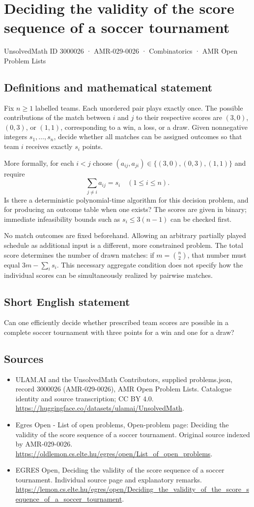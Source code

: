 \documentclass[11pt,a4paper]{article}
\begin{document}
\section*{Deciding the validity of the score sequence of a soccer tournament}\label{3000026}
{\small UnsolvedMath ID 3000026 · AMR-029-0026 · Combinatorics · AMR Open Problem Lists}
\subsection{Definitions and mathematical statement}
Fix $n\ge1$ labelled teams. Each unordered pair plays exactly once.
The possible contributions of the match between $i$ and $j$ to their
respective scores are $(3,0)$, $(0,3)$, or $(1,1)$, corresponding to
a win, a loss, or a draw. Given nonnegative integers $s_1,\ldots,s_n$,
decide whether all matches can be assigned outcomes so that team $i$
receives exactly $s_i$ points.

More formally, for each $i<j$ choose
$(a_{ij},a_{ji})\in\{(3,0),(0,3),(1,1)\}$ and require
\[
                             \sum_{j\ne i}a_{ij}=s_i
                                  \quad(1\le i\le n).
\]
Is there a deterministic polynomial-time algorithm for this decision
problem, and for producing an outcome table when one exists?
The scores are given in binary; immediate infeasibility bounds such as
$s_i\le3(n-1)$ can be checked first.

No match outcomes are fixed beforehand. Allowing an arbitrary partially
played schedule as additional input is a different, more constrained
problem. The total score determines the number of drawn matches:
if $m=\binom n2$, that number must equal $3m-\sum_i s_i$.
This necessary aggregate condition does not specify how the individual
scores can be simultaneously realized by pairwise matches.
\subsection{Short English statement}
Can one efficiently decide whether prescribed team scores are
possible in a complete soccer tournament with three points for a win and one for a draw?
\subsection{Sources}
\begin{itemize}
\item[S1] ULAM.AI and the UnsolvedMath Contributors, supplied problems.json, record 3000026 (AMR-029-0026), AMR Open Problem Lists. Catalogue identity and source transcription; CC BY 4.0.
\url{https://huggingface.co/datasets/ulamai/UnsolvedMath}.
\item[S2] Egres Open - List of open problems, Open-problem page: Deciding the validity of the score sequence of a soccer tournament. Original source indexed by AMR-029-0026.
\url{https://oldlemon.cs.elte.hu/egres/open/List_of_open_problems}.
\item[S3] EGRES Open, Deciding the validity of the score sequence of a soccer tournament. Individual source page and explanatory remarks.
\url{https://lemon.cs.elte.hu/egres/open/Deciding_the_validity_of_the_score_sequence_of_a_soccer_tournament}.
\end{itemize}
\end{document}
